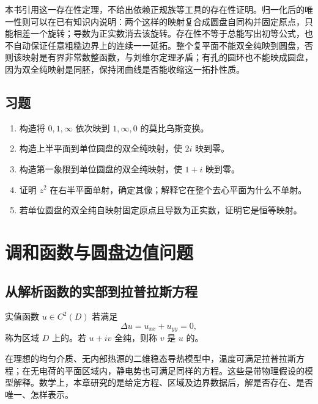 \documentclass[UTF8,12pt,a4paper,fontset=fandol]{ctexbook}
\begin{document}
本书引用这一存在性定理，不给出依赖正规族等工具的存在性证明。归一化后的唯一性则可以在已有知识内说明：两个这样的映射复合成圆盘自同构并固定原点，只能相差一个旋转；导数为正实数消去该旋转。存在性不等于总能写出初等公式，也不自动保证任意粗糙边界上的连续一一延拓。整个复平面不能双全纯映到圆盘，否则该映射是有界非常数整函数，与刘维尔定理矛盾；有孔的圆环也不能映成圆盘，因为双全纯映射是同胚，保持闭曲线是否能收缩这一拓扑性质。

\section{习题}
\label{sec:cv-conformal-ex}
\begin{enumerate}
 \item 构造将 $0,1,\infty$ 依次映到 $1,\infty,0$ 的莫比乌斯变换。
 \item 构造上半平面到单位圆盘的双全纯映射，使 $2i$ 映到零。
 \item 构造第一象限到单位圆盘的双全纯映射，使 $1+i$ 映到零。
 \item 证明 $z^2$ 在右半平面单射，确定其像；解释它在整个去心平面为什么不单射。
 \item 若单位圆盘的双全纯自映射固定原点且导数为正实数，证明它是恒等映射。
\end{enumerate}

\chapter{调和函数与圆盘边值问题}
\label{chap:cv-harmonic}

\section{从解析函数的实部到拉普拉斯方程}

\begin{definition}[调和函数与调和共轭]
实值函数 $u\in C^2(D)$ 若满足
\begin{equation}
 \Delta u=u_{xx}+u_{yy}=0,
 \label{eq:cv-laplace}
\end{equation}
称为区域 $D$ 上的。若 $u+iv$ 全纯，则称 $v$ 是 $u$ 的。
\end{definition}

在理想的均匀介质、无内部热源的二维稳态导热模型中，温度可满足拉普拉斯方程；在无电荷的平面区域内，静电势也可满足同样的方程。这些是带物理假设的模型解释。数学上，本章研究的是给定方程、区域及边界数据后，解是否存在、是否唯一、怎样表示。
\end{document}
